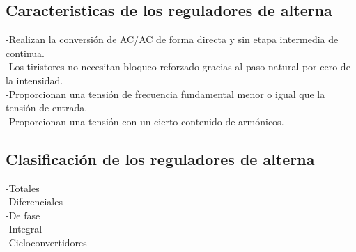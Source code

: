 \documentclass[12pt,a4paper]{article}
\begin{document}
\subsection{Caracteristicas de los reguladores de alterna\\}
\begin{flushleft}
-Realizan la conversión de AC/AC de forma directa y sin etapa intermedia de continua.\\
-Los tiristores no necesitan bloqueo reforzado gracias al paso natural por cero de la intensidad.\\ 
-Proporcionan una tensión de frecuencia fundamental menor o igual que la tensión de entrada.\\
-Proporcionan una tensión con un cierto contenido de armónicos.\\ 
\subsection{Clasificación de los reguladores de alterna}
\end{flushleft}
\begin{flushleft}
-Totales\\
-Diferenciales\\
-De fase\\
-Integral \\
-Cicloconvertidores\\
\end{flushleft}
\end{document}
